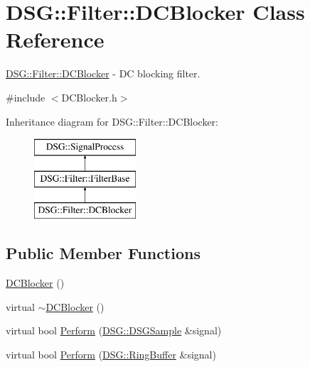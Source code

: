 \hypertarget{class_d_s_g_1_1_filter_1_1_d_c_blocker}{\section{D\+S\+G\+:\+:Filter\+:\+:D\+C\+Blocker Class Reference}
\label{class_d_s_g_1_1_filter_1_1_d_c_blocker}
}


\hyperlink{class_d_s_g_1_1_filter_1_1_d_c_blocker}{D\+S\+G\+::\+Filter\+::\+D\+C\+Blocker} -\/ D\+C blocking filter.  




{\ttfamily \#include $<$D\+C\+Blocker.\+h$>$}

Inheritance diagram for D\+S\+G\+:\+:Filter\+:\+:D\+C\+Blocker\+:\begin{figure}[H]
\begin{center}
\leavevmode
\includegraphics[height=3.000000cm]{class_d_s_g_1_1_filter_1_1_d_c_blocker}
\end{center}
\end{figure}
\subsection*{Public Member Functions}
\begin{DoxyCompactItemize}
\item 
\hyperlink{class_d_s_g_1_1_filter_1_1_d_c_blocker_a71cb7abe6fca10f64402971d8b4a6eb3}{D\+C\+Blocker} ()
\item 
virtual \hyperlink{class_d_s_g_1_1_filter_1_1_d_c_blocker_a5393dac29a226f5912f6d1705b69eecf}{$\sim$\+D\+C\+Blocker} ()
\item 
virtual bool \hyperlink{class_d_s_g_1_1_filter_1_1_d_c_blocker_a9757794b5f9b7789132e5eaa44e07cef}{Perform} (\hyperlink{namespace_d_s_g_ac39a94cd27ebcd9c1e7502d0c624894a}{D\+S\+G\+::\+D\+S\+G\+Sample} \&signal)
\item 
virtual bool \hyperlink{class_d_s_g_1_1_filter_1_1_d_c_blocker_a690b2fdc8fdb749d9832d8d744b8cb2f}{Perform} (\hyperlink{class_d_s_g_1_1_ring_buffer}{D\+S\+G\+::\+Ring\+Buffer} \&signal)
\end{DoxyCompactItemize}
